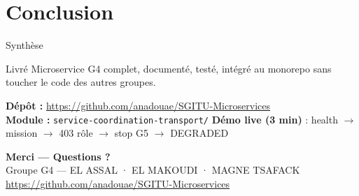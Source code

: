 \documentclass[aspectratio=169,t]{beamer}
\newcommand{\githubrepo}{\url{https://github.com/anadouae/SGITU-Microservices}}
\begin{document}
\section{Conclusion}

\begin{frame}{Synthèse}
  \begin{block}{Livré}
    Microservice G4 complet, documenté, testé, intégré au monorepo sans toucher le code des autres groupes.
  \end{block}
  \textbf{Dépôt :} \githubrepo\\
  \textbf{Module :} \texttt{service-coordination-transport/}
  \medskip
  \textbf{Démo live (3 min)} : health $\rightarrow$ mission $\rightarrow$ 403 rôle $\rightarrow$ stop G5 $\rightarrow$ DEGRADED
\end{frame}

\begin{frame}
  \begin{center}
    \vspace{2.8cm}
    {\LARGE\bfseries\color{white} Merci — Questions ?}\\[0.6cm]
    {\small\color{white!80} Groupe G4 — EL ASSAL · EL MAKOUDI · MAGNE TSAFACK}\\[0.2cm]
    {\footnotesize\color{white!60} \githubrepo}
  \end{center}
\end{frame}
\end{document}
